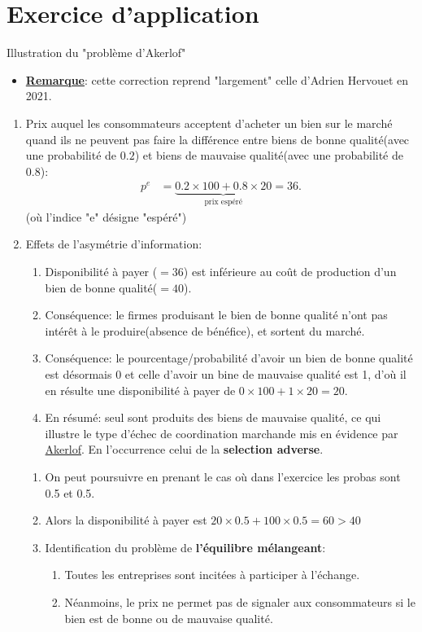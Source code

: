 \section{Exercice d’application}
\frame{\sectionpage}
\begin{frame}[allowframebreaks]{Illustration du "problème d’Akerlof"}
\begin{itemize}
\item \textbf{\underline{Remarque}}: cette correction reprend "largement" celle d'Adrien Hervouet en 2021.
\end{itemize}
\begin{enumerate}
\item Prix auquel les consommateurs acceptent d’acheter un bien sur le marché quand ils ne peuvent pas
 faire la différence entre biens de bonne qualité(avec une probabilité de $0.2$) 
 et biens de mauvaise qualité(avec une probabilité de $0.8$): 
 \begin{align*}
    p^{e}&= \underbrace{0.2\times 100 + 0.8\times 20}_{\text{prix espéré}} = 36.
 \end{align*}
 (où l'indice "e" désigne "espéré")
 \item Effets de l’asymétrie d’information:
 \begin{enumerate}[$\star$]
    \item Disponibilité à payer ($=36$) est inférieure au coût de production d'un bien de bonne 
    qualité($=40$).
    \item Conséquence: le firmes produisant le bien de bonne qualité n'ont 
    pas intérêt à le produire(absence de bénéfice), et sortent du marché. 
    \item Conséquence: le pourcentage/probabilité d'avoir un bien de 
    bonne qualité est désormais 0 et celle d'avoir un bine de mauvaise qualité est 1,
     d'où il en résulte une disponibilité à payer de $0\times 100 + 1\times 20=20$.
    \item  En résumé: seul sont produits des biens de mauvaise qualité, ce qui illustre le type d'échec de 
    coordination marchande mis en évidence par \href{https://fr.wikipedia.org/wiki/George_Akerlof}{Akerlof}. 
    En l'occurrence celui de la \textbf{selection adverse}.
\end{enumerate}

\framebreak
\begin{enumerate}[$\star$]
\item On peut poursuivre en prenant le cas où dans l'exercice les probas sont 0.5 et 0.5. 
\item Alors la disponibilité à payer est  $20\times 0.5 + 100\times 0.5 = 60>40$
 \item Identification du problème de \textbf{l’équilibre mélangeant}:
 \begin{enumerate}[$\star$]
 \item Toutes les entreprises sont incitées à participer à l’échange. 
 \item Néanmoins, le prix ne permet pas de signaler aux consommateurs
  si le bien est de bonne ou de mauvaise qualité.
 \end{enumerate}
\end{enumerate}
\framebreak


\end{enumerate}
\end{frame}
